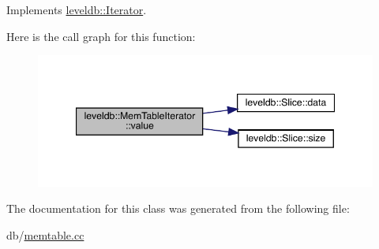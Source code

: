 Implements \mbox{\hyperlink{classleveldb_1_1_iterator_a613ac2e965518aad7a064c64c72bcf7c}{leveldb\+::\+Iterator}}.

Here is the call graph for this function\+:
\nopagebreak
\begin{figure}[H]
\begin{center}
\leavevmode
\includegraphics[width=347pt]{classleveldb_1_1_mem_table_iterator_a6c2907c8c87d2b2933adcd5f0e01f781_cgraph}
\end{center}
\end{figure}


The documentation for this class was generated from the following file\+:\begin{DoxyCompactItemize}
\item 
db/\mbox{\hyperlink{memtable_8cc}{memtable.\+cc}}\end{DoxyCompactItemize}
